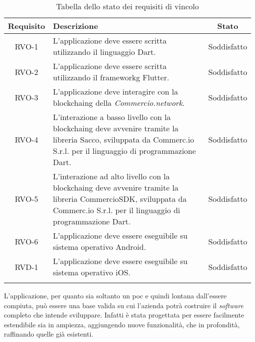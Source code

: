 \begin{longtable}{|c|p{8.35cm}|c|}
	\hline
	\rowcolor{gray}
	\textbf{Requisito} & \textbf{Descrizione} & \textbf{Stato} \\
	\hline
	RVO-1    & L'applicazione deve essere scritta utilizzando il linguaggio Dart. & Soddisfatto \\
	\hline
	RVO-2    & L'applicazione deve essere scritta utilizzando il \gls{frameworkg} Flutter. & Soddisfatto \\
	\hline
	RVO-3    & L'applicazione deve interagire con la \gls{blockchaing} della \textit{Commercio.network}. & Soddisfatto \\
	\hline
	RVO-4    & L'interazione a basso livello con la \gls{blockchaing} deve avvenire tramite la libreria Sacco, sviluppata da Commerc.io S.r.l. per il linguaggio di programmazione Dart. & Soddisfatto \\
	\hline
	RVO-5    & L'interazione ad alto livello con la \gls{blockchaing} deve avvenire tramite la libreria CommercioSDK, sviluppata da Commerc.io S.r.l. per il linguaggio di programmazione Dart. & Soddisfatto \\
	\hline
	RVO-6    & L'applicazione deve essere eseguibile su sistema operativo Android. & Soddisfatto \\
	\hline
	RVD-1    & L'applicazione deve essere eseguibile su sistema operativo iOS. & Soddisfatto \\
	\hline
	
	\caption{Tabella dello stato dei requisiti di vincolo}
	\label{tab:stato-requisiti-vincolo}
\end{longtable}
\noindent
L'applicazione, per quanto sia soltanto un \gls{poc} e quindi lontana dall'essere compiuta, può essere una base valida su cui l'azienda potrà costruire il \textit{software} completo che intende sviluppare. Infatti è stata progettata per essere facilmente estendibile sia in ampiezza, aggiungendo nuove funzionalità, che in profondità, raffinando quelle già esistenti. 